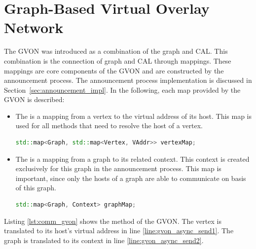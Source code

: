 \section{Graph-Based Virtual Overlay Network}
\label{sec:gvon_impl}
The GVON was introduced as a combination
of the graph and CAL. This combination is the connection of graph and CAL
through mappings. These mappings are core components of the GVON and are
constructed by the announcement process. The announcement process
implementation is discussed in Section~\ref{sec:announcement_impl}. In
the following, each map provided by the GVON is described:

\begin{itemize}
\item [] The  is a mapping from a vertex to the virtual
address of its host.  This map is used for all methods
that need to resolve the host of a vertex.

\begin{lstlisting}[language=C++, label=lst:mapping1]
std::map<Graph, std::map<Vertex, VAddr>> vertexMap;
\end{lstlisting}


\item [] The  is a mapping from a graph to its related
  context. This context is created exclusively for this graph in the
  announcement process.  This map is important, since only the hosts
  of a graph are able to communicate on basis of this graph.

\begin{lstlisting}[language=C++, label=lst:mapping2]
std::map<Graph, Context> graphMap;
\end{lstlisting}

\end{itemize}

\noindent Listing \ref{lst:comm_gvon} shows the  method of the
GVON. The vertex is translated to its host's virtual address in line
\ref{line:gvon_async_send1}. The graph is translated to its context
in line \ref{line:gvon_async_send2}.

